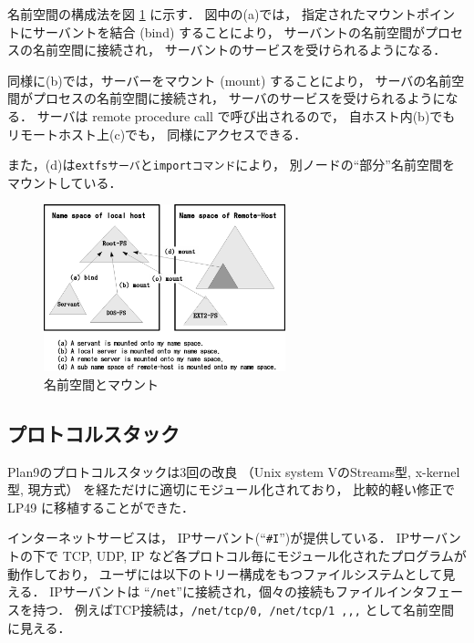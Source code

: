 \documentclass{ieicej}
\begin{document}
名前空間の構成法を図 \ref{fig:NSmount} に示す．
図中の(a)では，
指定されたマウントポイントにサーバントを結合 (bind) することにより，
サーバントの名前空間がプロセスの名前空間に接続され，
サーバントのサービスを受けられるようになる．

同様に(b)では，サーバーをマウント (mount) することにより，
サーバの名前空間がプロセスの名前空間に接続され，  
サーバのサービスを受けられるようになる．    
サーバは remote procedure call で呼び出されるので，
自ホスト内(b)でもリモートホスト上(c)でも，
同様にアクセスできる．

また，(d)は{\tt extfsサーバ}と{\tt importコマンド}により，
別ノードの``部分''名前空間をマウントしている．

\begin{figure}[tb]
  \begin{center}
   \includegraphics[width=70mm]{../fig/NSmount.eps}
    \caption{名前空間とマウント}
    \label{fig:NSmount}
  \end{center}
\end{figure}


\subsection{プロトコルスタック}

  Plan9のプロトコルスタックは3回の改良
（Unix system VのStreams型, x-kernel型\cite{xkernel}, 現方式）
 を経ただけに適切にモジュール化されており，
 比較的軽い修正でLP49 に移植することができた．

  インターネットサービスは，
  IPサーバント(``{\tt \#I}'')が提供している．
  IPサーバントの下で
  TCP, UDP, IP など各プロトコル毎にモジュール化されたプログラムが動作しており，
  ユーザには以下のトリー構成をもつファイルシステムとして見える．
  IPサーバントは ``{\tt /net}''に接続され，個々の接続もファイルインタフェースを持つ．
  例えばTCP接続は，{\tt /net/tcp/0, /net/tcp/1 ,,,} として名前空間に見える．
\end{document}
